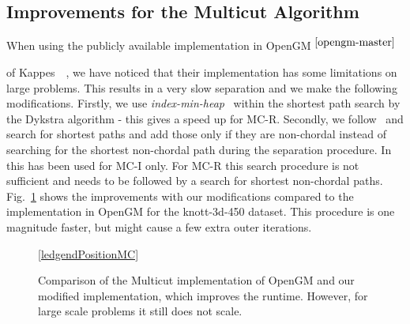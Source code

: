 \documentclass[10pt,twocolumn,letterpaper]{article}
\newcommand{\footref}[1]{%
    $^{\ref{#1}}$%
}
\theoremstyle{definition}
\begin{document}
\subsection{Improvements for the Multicut Algorithm}\label{sec:tunedMC} 
When using the  publicly available implementation in OpenGM\footref{opengm-master}
of Kappes~\etal~\cite{kappes_2013_arxiv}, we have noticed that their implementation has some limitations on large problems.
This results in a very slow separation and we make the following modifications.
Firstly, we use \emph{index-min-heap}~\cite{Sedgewick-2011} within the shortest path search by the Dykstra algorithm - this gives a speed up for MC-R.
Secondly, we follow~\cite{kroeger_2012_eccv} and search for shortest paths and add those only if they are non-chordal instead of searching for the shortest non-chordal path
during the separation procedure. 
In~\cite{kroeger_2012_eccv} this has been used for MC-I only. 
For MC-R this search procedure is not sufficient and needs to be followed by a search for shortest non-chordal paths.
%
Fig.~\ref{fig:at:knott-450b} shows the improvements with our modifications compared to the implementation in OpenGM for the knott-3d-450 dataset.
This procedure is one magnitude faster, but might cause a few extra outer iterations.

 \begin{figure}[t]
    \centering
  \begin{center}
  \hypersetup{linkcolor = black}
  \ref{ledgendPositionMC}
  \hypersetup{linkcolor = red}
  \end{center}
    \caption{Comparison of the Multicut implementation of OpenGM and 
    our modified implementation, which improves the runtime.
    However, for large scale problems it still does not scale.}
    \label{fig:at:knott-450b}
  \end{figure}
\end{document}
